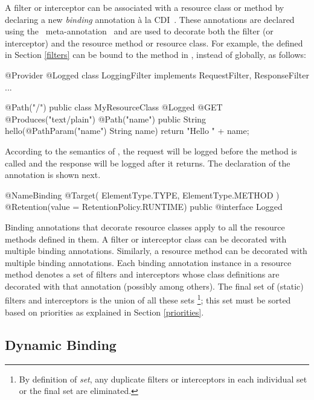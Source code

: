 A filter or interceptor can be associated with a resource class or method by declaring a new \emph{binding} annotation \`{a} la CDI~\cite{jsr299}. These annotations are declared using the \jaxrs\ meta-annotation \NameBinding\ and are used to decorate both the filter (or interceptor) and the resource method or resource class. For example, the  defined in Section \ref{filters} can be bound to the method  in , instead of globally, as follows:

\begin{listing}{1}
@Provider
@Logged
class LoggingFilter implements RequestFilter, ResponseFilter {
    ...
}
\end{listing}

\begin{listing}{1}
@Path("/")
public class MyResourceClass {
    @Logged
    @GET
    @Produces("text/plain")
    @Path("{name}")
    public String hello(@PathParam("name") String name) {
        return "Hello " + name;
    }
}
\end{listing}

According to the semantics of , the request will be logged before the  method is called and the response will be logged after it returns. The declaration of the  annotation is shown next.

\begin{listing}{1}
@NameBinding
@Target({ ElementType.TYPE, ElementType.METHOD })
@Retention(value = RetentionPolicy.RUNTIME)
public @interface Logged { }
\end{listing}

Binding annotations that decorate resource classes apply to all the resource methods defined in them. A filter or interceptor class can be decorated with multiple binding annotations. Similarly, a resource method can be decorated with multiple binding annotations.  Each binding annotation instance in a resource method denotes a set of filters and interceptors whose class definitions are decorated with that annotation (possibly among others). The final set of (static) filters and interceptors is the union of all these sets \footnote{By definition of {\em set}, any duplicate filters or interceptors in each individual set or the final set are eliminated.}; this set must be sorted based on priorities as explained in Section \ref{priorities}. 

\subsection{Dynamic Binding}

